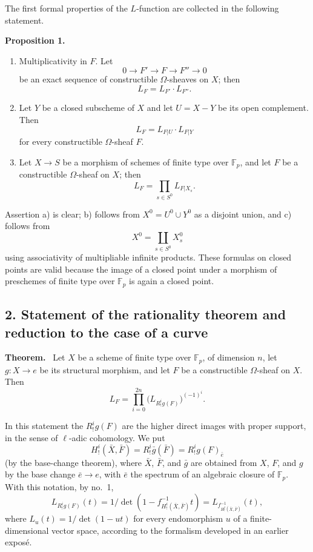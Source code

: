 \documentclass[11pt]{article}
\newenvironment{statement}[1]{\par\medskip\noindent\textbf{#1.}\ }{\par\medskip}
\begin{document}
The first formal properties of the $L$-function are collected in the following statement.

\begin{statement}{Proposition 1}
\begin{enumerate}[label=\alph*)]
\item Multiplicativity in $F$. Let
\[
0\longrightarrow F'\longrightarrow F\longrightarrow F''\longrightarrow0
\]
be an exact sequence of constructible $\Omega$-sheaves on $X$; then
\[
L_F=L_{F'}\cdot L_{F''}.
\]
\item Let $Y$ be a closed subscheme of $X$ and let $U=X-Y$ be its open complement. Then
\[
L_F=L_{F|U}\cdot L_{F|Y}
\]
for every constructible $\Omega$-sheaf $F$.
\item Let $X\to S$ be a morphism of schemes of finite type over $\mathbb F_p$, and let $F$ be a constructible $\Omega$-sheaf on $X$; then
\[
L_F=\prod_{s\in S^0}L_{F|X_s}.
\]
\end{enumerate}
\end{statement}

Assertion a) is clear; b) follows from $X^0=U^0\cup Y^0$ as a disjoint union, and c) follows from
\[
X^0=\coprod_{s\in S^0}X_s^0
\]
using associativity of multipliable infinite products. These formulas on closed points are valid because the image of a closed point under a morphism of preschemes of finite type over $\mathbb F_p$ is again a closed point.

\subsection*{2. Statement of the rationality theorem and reduction to the case of a curve}

\begin{statement}{Theorem}
Let $X$ be a scheme of finite type over $\mathbb F_p$, of dimension $n$, let $g:X\to e$ be its structural morphism, and let $F$ be a constructible $\Omega$-sheaf on $X$. Then
\[
L_F=\prod_{i=0}^{2n}\bigl(L_{R^i_!g(F)}\bigr)^{(-1)^i}.
\tag{1}
\]
\end{statement}

In this statement the $R^i_!g(F)$ are the higher direct images with proper support, in the sense of $\ell$-adic cohomology. We put
\[
H^i_!(\bar X,\bar F)=R^i_!\bar g(\bar F)=R^i_!g(F)_{\bar e}
\]
(by the base-change theorem), where $\bar X$, $\bar F$, and $\bar g$ are obtained from $X$, $F$, and $g$ by the base change $\bar e\to e$, with $\bar e$ the spectrum of an algebraic closure of $\mathbb F_p$. With this notation, by no.~1,
\[
L_{R^i_!g(F)}(t)=1/\det(1-f^{-1}_{H^i_!(\bar X,\bar F)}t)
 =L_{f^{-1}_{H^i_!(\bar X,\bar F)}}(t),
\]
where $L_u(t)=1/\det(1-ut)$ for every endomorphism $u$ of a finite-dimensional vector space, according to the formalism developed in an earlier exposé.
\end{document}
